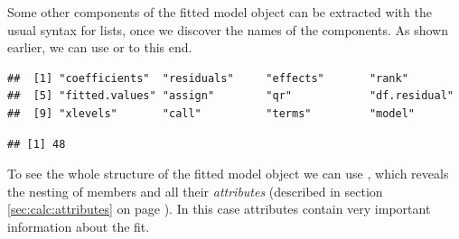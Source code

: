 \documentclass[krantz2]{krantz}\usepackage{knitr}%
\begin{document}
Some other components of the fitted model object can be extracted with the usual syntax for lists, once we discover the names of the components. As shown earlier, we can use  or  to this end.

\begin{knitrout}\footnotesize
{}\color{fgcolor}\begin{kframe}
\begin{alltt}
\end{alltt}
\begin{verbatim}
##  [1] "coefficients"  "residuals"     "effects"       "rank"         
##  [5] "fitted.values" "assign"        "qr"            "df.residual"  
##  [9] "xlevels"       "call"          "terms"         "model"
\end{verbatim}
\end{kframe}
\end{knitrout}

\begin{knitrout}\footnotesize
{}\color{fgcolor}\begin{kframe}
\begin{alltt}
\hlopt{$}
\end{alltt}
\begin{verbatim}
## [1] 48
\end{verbatim}
\end{kframe}
\end{knitrout}

To see the whole structure of the fitted model object we can use , which reveals the nesting of members and all their \emph{attributes} (described in section \ref{sec:calc:attributes} on page \pageref{sec:calc:attributes}). In this case attributes contain very important information about the fit.
\end{document}
